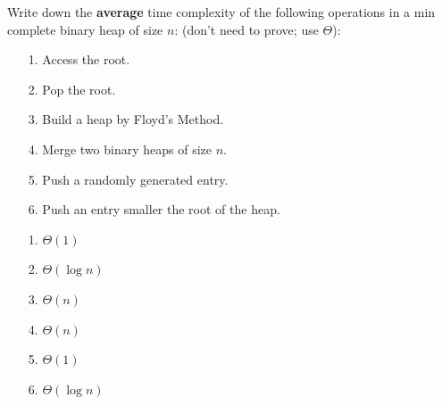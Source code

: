 \begin{parts}
Write down the \textbf{average} time complexity of the following operations in a min complete binary heap of size $n$: (don't need to prove; use $\Theta$):
\begin{itemize}
    \item[1.] Access the root.
    \item[2.] Pop the root.
    \item[3.] Build a heap by Floyd’s Method.
    \item[4.] Merge two binary heaps of size $n$.
    \item[5.] Push a randomly generated entry.
    \item[6.] Push an entry smaller the root of the heap.
\end{itemize}
\begin{solution}
\begin{enumerate}
    \item[1.] $\Theta(1)$
    \item[2.] $\Theta(\log n)$
    \item[3.] $\Theta(n)$
    \item[4.] $\Theta(n)$
    \item[5.] $\Theta(1)$
    \item[6.] $\Theta(\log n)$
\end{enumerate}
\end{solution}
\end{parts}
